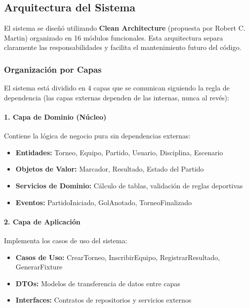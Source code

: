 \documentclass[12pt,a4paper]{article}
\begin{document}
\subsection{Arquitectura del Sistema}

El sistema se diseñó utilizando \textbf{Clean Architecture} (propuesta por Robert C. Martin) organizado en 16 módulos funcionales. Esta arquitectura separa claramente las responsabilidades y facilita el mantenimiento futuro del código.

\subsubsection{Organización por Capas}

El sistema está dividido en 4 capas que se comunican siguiendo la regla de dependencia (las capas externas dependen de las internas, nunca al revés):

\paragraph{1. Capa de Dominio (Núcleo)}

Contiene la lógica de negocio pura sin dependencias externas:

\begin{itemize}[noitemsep]
    \item \textbf{Entidades:} Torneo, Equipo, Partido, Usuario, Disciplina, Escenario
    \item \textbf{Objetos de Valor:} Marcador, Resultado, Estado del Partido
    \item \textbf{Servicios de Dominio:} Cálculo de tablas, validación de reglas deportivas
    \item \textbf{Eventos:} PartidoIniciado, GolAnotado, TorneoFinalizado
\end{itemize}

\paragraph{2. Capa de Aplicación}

Implementa los casos de uso del sistema:

\begin{itemize}[noitemsep]
    \item \textbf{Casos de Uso:} CrearTorneo, InscribirEquipo, RegistrarResultado, GenerarFixture
    \item \textbf{DTOs:} Modelos de transferencia de datos entre capas
    \item \textbf{Interfaces:} Contratos de repositorios y servicios externos
\end{itemize}
\end{document}
